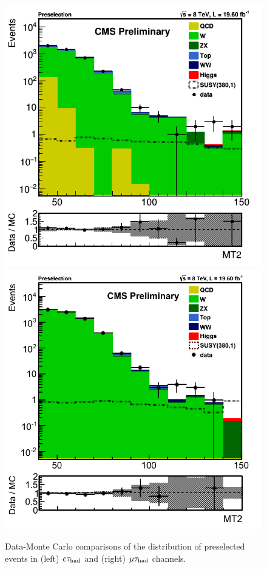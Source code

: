 \begin{figure}[!Hhtb]
\centering
\includegraphics[angle=0,scale=0.35]{SelectionEleTau/MT2.png}
\includegraphics[angle=0,scale=0.35]{SelectionMuTau/MT2_Ratio_Preselection_unBlinded.png}
\caption{Data-Monte Carlo comparisons of the \mttwo distribution of preselected events in (left) $e\tau_{\rm had}$ and (right) $\mu\tau_{\rm had}$ channels.}
\label{fig:mt2leptontau}
\end{figure}


